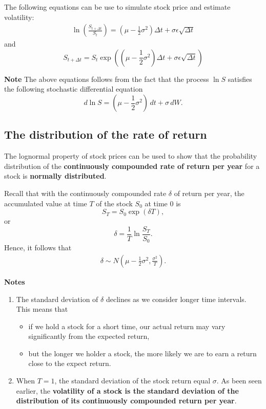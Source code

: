 \documentclass[
]{book}
\theoremstyle{definition}
\theoremstyle{definition}
\theoremstyle{definition}
\theoremstyle{definition}
\theoremstyle{remark}
\begin{document}
The following equations can be use to simulate stock price and estimate
volatility: \[\begin{aligned}
 \label{lognormalModel}
\ln\left(  \frac{S_{t+\Delta t}}{S_t} \right) = (\mu - \frac{1}{2}\sigma^2 )\Delta t + \sigma \epsilon \sqrt{\Delta t}\end{aligned}\]
and
\[S_{t+ \Delta t}  = S_t \exp(   (\mu - \frac{1}{2}\sigma^2 )\Delta t + \sigma \epsilon \sqrt{\Delta t}  )\]

\textbf{Note} The above equations follows from the fact that the process
\(\ln S\) satisfies the following stochastic differential equation
\[d \ln S =  (\mu - \frac{1}{2}\sigma^2 ) \, dt + \sigma \, d W.\]

\hypertarget{the-distribution-of-the-rate-of-return}{%
\subsection{The distribution of the rate of return}\label{the-distribution-of-the-rate-of-return}}

The lognormal property of stock prices can be used to show that the
probability distribution of the \textbf{continuously compounded rate of return
per year} for a stock is \textbf{normally distributed}.

Recall that with the continuously compounded rate \(\delta\) of return per
year, the accumulated value at time \(T\) of the stock \(S_0\) at time 0 is
\[S_T = S_0 \exp(\delta T),\] or
\[\delta = \frac{1}{T} \ln \frac{S_T}{S_0}.\] Hence, it follows that
\[\begin{aligned}
\label{returnRate}
     \delta \sim N\left( \mu - \frac{1}{2}\sigma^2 , \frac{\sigma^2}{T} \right).\end{aligned}\]

\textbf{Notes}

\begin{enumerate}
\def\labelenumi{\arabic{enumi}.}
\item
  The standard deviation of \(\delta\) declines as we consider longer
  time intervals. This means that

  \begin{itemize}
  \item
    if we hold a stock for a short time, our actual return may vary
    significantly from the expected return,
  \item
    but the longer we holder a stock, the more likely we are to earn
    a return close to the expect return.
  \end{itemize}
\item
  When \(T = 1\), the standard deviation of the stock return equal
  \(\sigma\). As been seen earlier, the \textbf{volatility of a stock is the
  standard deviation of the distribution of its continuously
  compounded return per year}.
\end{enumerate}
\end{document}
